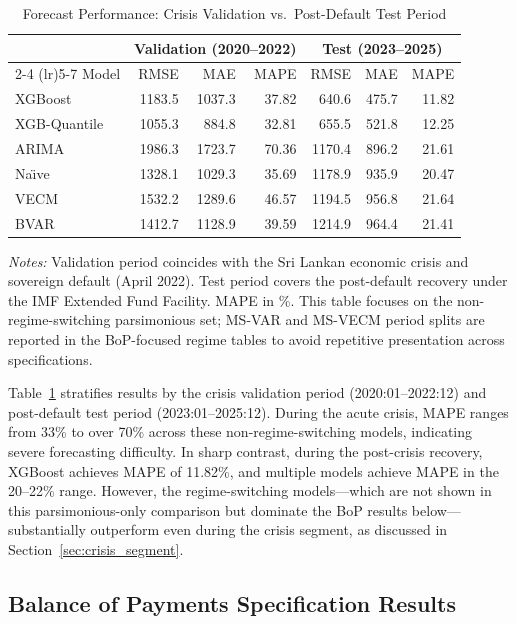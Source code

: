 \documentclass[12pt,a4paper]{article}
\begin{document}
\begin{table}[htbp]
\centering
\caption{Forecast Performance: Crisis Validation vs.\ Post-Default Test Period}
\label{tab:val_vs_test}
\begin{tabular}{lrrr@{\hskip 12pt}rrr}
\toprule
& \multicolumn{3}{c}{Validation (2020--2022)} & \multicolumn{3}{c}{Test (2023--2025)} \\
\cmidrule(lr){2-4} \cmidrule(lr){5-7}
Model & RMSE & MAE & MAPE & RMSE & MAE & MAPE \\
\midrule
XGBoost & 1183.5 & 1037.3 & 37.82 & 640.6 & 475.7 & 11.82 \\
XGB-Quantile & 1055.3 & 884.8 & 32.81 & 655.5 & 521.8 & 12.25 \\
ARIMA & 1986.3 & 1723.7 & 70.36 & 1170.4 & 896.2 & 21.61 \\
Na\"{\i}ve & 1328.1 & 1029.3 & 35.69 & 1178.9 & 935.9 & 20.47 \\
VECM & 1532.2 & 1289.6 & 46.57 & 1194.5 & 956.8 & 21.64 \\
BVAR & 1412.7 & 1128.9 & 39.59 & 1214.9 & 964.4 & 21.41 \\
\bottomrule
\end{tabular}
\begin{tablenotes}
\small
\item \textit{Notes:} Validation period coincides with the Sri Lankan economic crisis and sovereign default (April 2022). Test period covers the post-default recovery under the IMF Extended Fund Facility. MAPE in \%. This table focuses on the non-regime-switching parsimonious set; MS-VAR and MS-VECM period splits are reported in the BoP-focused regime tables to avoid repetitive presentation across specifications.
\end{tablenotes}
\end{table}

Table~\ref{tab:val_vs_test} stratifies results by the crisis validation period (2020:01--2022:12) and post-default test period (2023:01--2025:12). During the acute crisis, MAPE ranges from 33\% to over 70\% across these non-regime-switching models, indicating severe forecasting difficulty. In sharp contrast, during the post-crisis recovery, XGBoost achieves MAPE of 11.82\%, and multiple models achieve MAPE in the 20--22\% range. However, the regime-switching models---which are not shown in this parsimonious-only comparison but dominate the BoP results below---substantially outperform even during the crisis segment, as discussed in Section~\ref{sec:crisis_segment}.

\subsection{Balance of Payments Specification Results}
\end{document}
